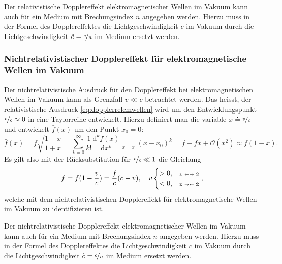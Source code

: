 \documentclass[a4paper,12pt]{article}
\numberwithin{equation}{section}
\begin{document}
Der relativistische Dopplereffekt elektromagnetischer Wellen im Vakuum kann auch für ein Medium mit Brechungsindex $n$ angegeben werden. Hierzu muss in der Formel des Dopplereffektes die Lichtgeschwindigkeit $c$ im Vakuum durch die Lichtgeschwindigkeit $\tilde{c} = \nicefrac{c}{n}$ im Medium ersetzt werden.

\subsubsection{Nichtrelativistischer Dopplereffekt für elektromagnetische Wellen im Vakuum}
Der nichtrelativistische Ausdruck für den Dopplereffekt bei elektromagnetischen Wellen im Vakuum kann als Grenzfall $v \ll c$ betrachtet werden. Das heisst, der relativistische Ausdruck \eqref{eq:dopplerrelemwellen} wird um den Entwicklungspunkt $\nicefrac{v}{c} \approx 0$ in eine Taylorreihe entwickelt. Hierzu definiert man die variable $x \doteq \nicefrac{v}{c}$ und entwickelt $\bar{f}(x)$ um den Punkt $x_0 = 0$: \begin{equation}\label{eq:tayloralldopptononrelatdoppl}
\bar{f}(x) = f\sqrt{\frac{1-x}{1+x}} = \sum_{k=0}^{\infty}\frac{1}{k!}\frac{\mathrm{d}^{k}f(x)}{\mathrm{d}x^{k}}\bigg|_{x=x_0}(x-x_0)^k = f - fx + \mathcal{O}(x^2) \approx f(1-x).
\end{equation} Es gilt also mit der Rücksubstitution für $\nicefrac{v}{c} \ll 1$ die Gleichung \begin{equation}\label{eq:allgdoppleremwellen}
\bar{f} = f(1-\frac{v}{c}) = \frac{f}{c}(c-v), \quad v \begin{cases}
> 0, & \text{\tiny $\Sigma$ $\leftarrow \rightarrow$ $\bar{\Sigma}$} \\ < 0, & \text{\tiny $\Sigma$ $\rightarrow \leftarrow$ $\bar{\Sigma}$}
\end{cases},
\end{equation} welche mit dem nichtrelativistischen Dopplereffekt für elektromagnetische Wellen im Vakuum zu identifizieren ist.

Der nichtrelativistische Dopplereffekt elektromagnetischer Wellen im Vakuum kann auch für ein Medium mit Brechungsindex $n$ angegeben werden. Hierzu muss in der Formel des Dopplereffektes die Lichtgeschwindigkeit $c$ im Vakuum durch die Lichtgeschwindigkeit $\tilde{c} = \nicefrac{c}{n}$ im Medium ersetzt werden.
\end{document}
